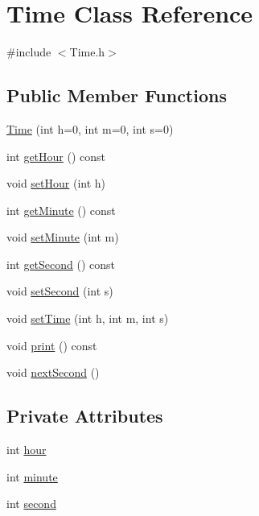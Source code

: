 \hypertarget{classTime}{}\section{Time Class Reference}
\label{classTime}


{\ttfamily \#include $<$Time.\+h$>$}

\subsection*{Public Member Functions}
\begin{DoxyCompactItemize}
\item 
\hyperlink{classTime_a0fc29d4a1be77a0f9fe1cd28c1d34958}{Time} (int h=0, int m=0, int s=0)
\item 
int \hyperlink{classTime_a4e9d93c2aaaac84b0a49f44184968860}{get\+Hour} () const 
\item 
void \hyperlink{classTime_a79e74e17893cf244e1318ceb9b1c7f32}{set\+Hour} (int h)
\item 
int \hyperlink{classTime_a6ccac73be7aacc12410cea6b3d216357}{get\+Minute} () const 
\item 
void \hyperlink{classTime_a35779c16a9db3499a27eccd58793f3b5}{set\+Minute} (int m)
\item 
int \hyperlink{classTime_adc2217366bfc4bb39eb547982747b6da}{get\+Second} () const 
\item 
void \hyperlink{classTime_a0528cf12858546b60ebb33fdcbc3fca2}{set\+Second} (int s)
\item 
void \hyperlink{classTime_ae05f94882a72debabb02e0889054d89a}{set\+Time} (int h, int m, int s)
\item 
void \hyperlink{classTime_acd9b7522e50fc667d81468219c5756e8}{print} () const 
\item 
void \hyperlink{classTime_a888a02dc15e919c5bafc4dcc95f093b7}{next\+Second} ()
\end{DoxyCompactItemize}
\subsection*{Private Attributes}
\begin{DoxyCompactItemize}
\item 
int \hyperlink{classTime_a497d35aa44ea40706dbab08f7a31d069}{hour}
\item 
int \hyperlink{classTime_a6c2e13147da34803a9784aa2b8bf8da8}{minute}
\item 
int \hyperlink{classTime_a63c9e64c7b453e10ba0f7f28bfedbcbf}{second}
\end{DoxyCompactItemize}


